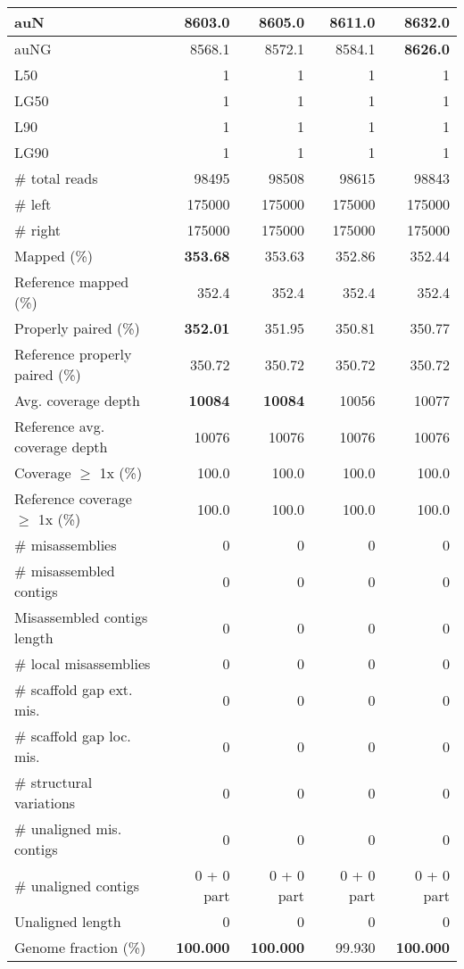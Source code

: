 \documentclass[12pt,a4paper]{article}
\begin{document}
\begin{table}[ht]
\begin{center}
\begin{tabular}{|l*{4}{|r}|}
auN & 8603.0 & 8605.0 & 8611.0 & {\bf 8632.0} \\ \hline
auNG & 8568.1 & 8572.1 & 8584.1 & {\bf 8626.0} \\ \hline
L50 & 1 & 1 & 1 & 1 \\ \hline
LG50 & 1 & 1 & 1 & 1 \\ \hline
L90 & 1 & 1 & 1 & 1 \\ \hline
LG90 & 1 & 1 & 1 & 1 \\ \hline
\# total reads & 98495 & 98508 & 98615 & 98843 \\ \hline
\# left & 175000 & 175000 & 175000 & 175000 \\ \hline
\# right & 175000 & 175000 & 175000 & 175000 \\ \hline
Mapped (\%) & {\bf 353.68} & 353.63 & 352.86 & 352.44 \\ \hline
Reference mapped (\%) & 352.4 & 352.4 & 352.4 & 352.4 \\ \hline
Properly paired (\%) & {\bf 352.01} & 351.95 & 350.81 & 350.77 \\ \hline
Reference properly paired (\%) & 350.72 & 350.72 & 350.72 & 350.72 \\ \hline
Avg. coverage depth & {\bf 10084} & {\bf 10084} & 10056 & 10077 \\ \hline
Reference avg. coverage depth & 10076 & 10076 & 10076 & 10076 \\ \hline
Coverage $\geq$ 1x (\%) & 100.0 & 100.0 & 100.0 & 100.0 \\ \hline
Reference coverage $\geq$ 1x (\%) & 100.0 & 100.0 & 100.0 & 100.0 \\ \hline
\# misassemblies & 0 & 0 & 0 & 0 \\ \hline
\# misassembled contigs & 0 & 0 & 0 & 0 \\ \hline
Misassembled contigs length & 0 & 0 & 0 & 0 \\ \hline
\# local misassemblies & 0 & 0 & 0 & 0 \\ \hline
\# scaffold gap ext. mis. & 0 & 0 & 0 & 0 \\ \hline
\# scaffold gap loc. mis. & 0 & 0 & 0 & 0 \\ \hline
\# structural variations & 0 & 0 & 0 & 0 \\ \hline
\# unaligned mis. contigs & 0 & 0 & 0 & 0 \\ \hline
\# unaligned contigs & 0 + 0 part & 0 + 0 part & 0 + 0 part & 0 + 0 part \\ \hline
Unaligned length & 0 & 0 & 0 & 0 \\ \hline
Genome fraction (\%) & {\bf 100.000} & {\bf 100.000} & 99.930 & {\bf 100.000} \\ \hline

\end{tabular}
\end{center}
\end{table}
\end{document}
